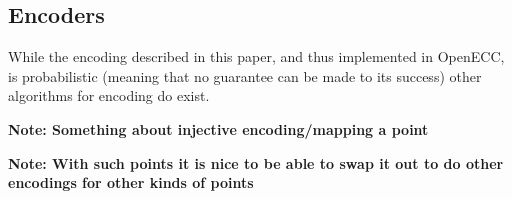 \subsection{Encoders}
\label{sec:implementation_encoding}

While the encoding described in this paper, and thus implemented in OpenECC, is probabilistic (meaning that no
guarantee can be made to its success) other algorithms for encoding do exist.

\textbf{Note: Something about injective encoding/mapping a point}

\textbf{Note: With such points it is nice to be able to swap it out to do other encodings for other kinds of points}